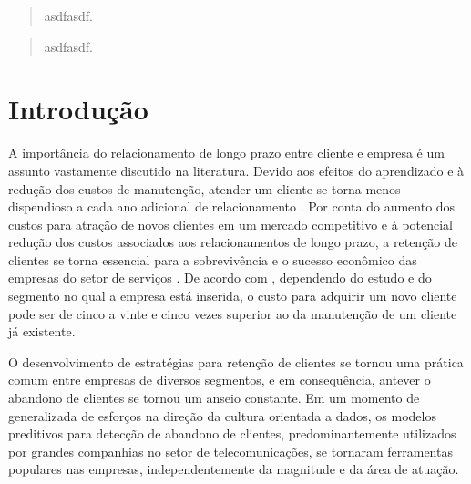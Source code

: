 \documentclass[twocolumn]{rbef}
\author[]{Antonio C. da Silva Júnior}
\affil[]{Campus Santos, Universidade Paulista Av. Conselheiro Nébias 766, Boqueirão, 11045-002, Santos, SP, Brasil\thanks{\href{emailto:juniorssz@gmail.com}{\href{mailto:juniorssz@gmail.com}{\nolinkurl{juniorssz@gmail.com}}}}
}
\newcommand{\1}{\mathbbm{1}}
\begin{document}

\begin{primeirapagina}


  \begin{abstract}
    asdfasdf.

  \end{abstract}

  \begin{otherlanguage}{english}

    \begin{abstract}
      asdfasdf.

    \end{abstract}
  \end{otherlanguage}

\end{primeirapagina}
\saythanks

\hypertarget{introduuxe7uxe3o}{%
\section{Introdução}\label{introduuxe7uxe3o}}

A importância do relacionamento de longo prazo entre cliente e empresa é um assunto vastamente discutido na literatura. Devido aos efeitos do aprendizado e à redução dos custos de manutenção, atender um cliente se torna menos dispendioso a cada ano adicional de relacionamento \cite{Ganesh2000}. Por conta do aumento dos custos para atração de novos clientes em um mercado competitivo e à potencial redução dos custos associados aos relacionamentos de longo prazo, a retenção de clientes se torna essencial para a sobrevivência e o sucesso econômico das empresas do setor de serviços \cite{HennigThurau2004}. De acordo com \cite{Gallo2014}, dependendo do estudo e do segmento no qual a empresa está inserida, o custo para adquirir um novo cliente pode ser de cinco a vinte e cinco vezes superior ao da manutenção de um cliente já existente.

O desenvolvimento de estratégias para retenção de clientes se tornou uma prática comum entre empresas de diversos segmentos, e em consequência, antever o abandono de clientes se tornou um anseio constante. Em um momento de generalizada de esforços na direção da cultura orientada a dados, os modelos preditivos para detecção de abandono de clientes, predominantemente utilizados por grandes companhias no setor de telecomunicações, se tornaram ferramentas populares nas empresas, independentemente da magnitude e da área de atuação.
\end{document}
